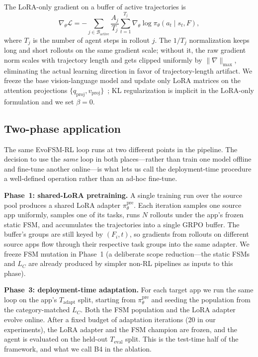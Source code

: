 The LoRA-only gradient on a buffer of active trajectories is
\begin{equation}
\nabla_\theta \mathcal{L} = -\sum_{j \in \mathcal{B}_{\text{active}}} \frac{A_j}{T_j} \sum_{t=1}^{T_j} \nabla_\theta \log \pi_\theta(a_t \mid s_t, F),
\label{eq:grpo-loss}
\end{equation}
where $T_j$ is the number of agent steps in rollout $j$. The $1/T_j$ normalization keeps long and short rollouts on the same gradient scale; without it, the raw gradient norm scales with trajectory length and gets clipped uniformly by $\|\nabla\|_{\max}$, eliminating the actual learning direction in favor of trajectory-length artifact. We freeze the base vision-language model and update only LoRA matrices on the attention projections $\{q_{\text{proj}}, v_{\text{proj}}\}$~\citep{hu2021lora}; KL regularization is implicit in the LoRA-only formulation and we set $\beta = 0$.

\subsection{Two-phase application}
\label{sec:method-phases}

The same EvoFSM-RL loop runs at two different points in the pipeline. The decision to use the \emph{same} loop in both places---rather than train one model offline and fine-tune another online---is what lets us call the deployment-time procedure a well-defined operation rather than an ad-hoc fine-tune.

\textbf{Phase~1: shared-LoRA pretraining.} A single training run over the source pool produces a shared LoRA adapter $\pi^{\text{pre}}_\theta$. Each iteration samples one source app uniformly, samples one of its tasks, runs $N$ rollouts under the app's frozen static FSM, and accumulates the trajectories into a single GRPO buffer. The buffer's groups are still keyed by $(F_i, t)$, so gradients from rollouts on different source apps flow through their respective task groups into the same adapter. We freeze FSM mutation in Phase~1 (a deliberate scope reduction---the static FSMs and $L_C$ are already produced by simpler non-RL pipelines as inputs to this phase).

\textbf{Phase~3: deployment-time adaptation.} For each target app we run the same loop on the app's $T_{\text{adapt}}$ split, starting from $\pi^{\text{pre}}_\theta$ and seeding the population from the category-matched $L_C$. Both the FSM population and the LoRA adapter evolve online. After a fixed budget of adaptation iterations (20 in our experiments), the LoRA adapter and the FSM champion are frozen, and the agent is evaluated on the held-out $T_{\text{eval}}$ split. This is the test-time half of the framework, and what we call B4 in the ablation.

